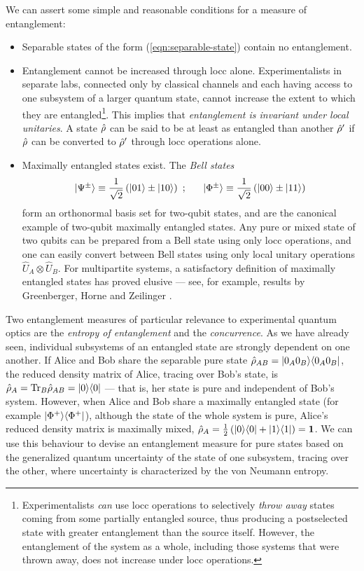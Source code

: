 We can assert some simple and reasonable conditions for a measure of entanglement: 
\begin{itemize}
\item Separable states of the form (\ref{eqn:separable-state}) contain no entanglement.
\item Entanglement cannot be increased through \gls{locc} alone. Experimentalists in separate labs, connected only by classical channels and each having access to one subsystem of a larger quantum state, cannot increase the extent to which they are entangled\footnote{Experimentalists \emph{can} use \gls{locc} operations to selectively \emph{throw away} states coming from some partially entangled source, thus producing a postselected state with greater entanglement than the source itself. However, the entanglement of the system as a whole, including those systems that were thrown away, does not increase under \gls{locc} operations.}. 
This implies that \emph{entanglement is invariant under local unitaries}.  A state $\hat{\rho}$ can be said to be at least as entangled than another $\hat{\rho}'$ if $\hat{\rho}$ can be converted to $\hat{\rho}'$ through \gls{locc} operations alone.
\item Maximally entangled states exist. The \emph{Bell states}
\begin{equation}
\mbox{$ | \Psi^{\pm} \rangle $} \equiv \frac{1}{\sqrt{2}} \left( \mbox{$ | 01 \rangle $} \pm \mbox{$ | 10 \rangle $} \right)~;~~~~~
\mbox{$ | \Phi^{\pm} \rangle $} \equiv \frac{1}{\sqrt{2}} \left( \mbox{$ | 00 \rangle $} \pm \mbox{$ | 11 \rangle $} \right) 
\label{eqn:bell-states}
\end{equation}
form an orthonormal basis set for two-qubit states, and are the canonical example of two-qubit maximally entangled states.
Any pure or mixed state of two qubits can be prepared from a Bell state using only \gls{locc} operations, and one can easily convert between Bell states using only local unitary operations $\hat{U}_A \otimes \hat{U}_B$.
For multipartite systems, a satisfactory definition of maximally entangled states has proved elusive --- see, for example, results by Greenberger, Horne and Zeilinger \cite{Greenberger1990}.
\end{itemize}

Two entanglement measures of particular relevance to experimental quantum optics are the  \emph{entropy of entanglement} and the \emph{concurrence}. 
As we have already seen, individual subsystems of an entangled state are strongly dependent on one another.
If Alice and Bob share the separable pure state $\hat{\rho}_{AB} = \mbox{$ | 0_A0_B \rangle $}\mbox{$ \langle 0_A0_B | $}$, the reduced density matrix of Alice, tracing over Bob's state, is $\hat{\rho}_{A} = \textrm{Tr}_B \hat{\rho}_{AB} = \mbox{$ | 0 \rangle $}\mbox{$ \langle 0 | $}$ --- that is, her state is pure and independent of Bob's system.
However, when Alice and Bob share a maximally entangled state (for example $\mbox{$ | \Phi^+ \rangle $}\mbox{$ \langle \Phi^+ | $}$), although the state of the whole system is pure,  Alice's reduced density matrix is maximally mixed, $\hat{\rho}_{A} = \frac{1}{2}\left(\mbox{$ | 0 \rangle $}\mbox{$ \langle 0 | $} + \mbox{$ | 1 \rangle $}\mbox{$ \langle 1 | $}\right) = \mathbf{1}$. 
We can use this behaviour to devise an entanglement measure for pure states based on the generalized quantum uncertainty of the state of one subsystem, tracing over the other, where uncertainty is characterized by the von Neumann entropy. 

